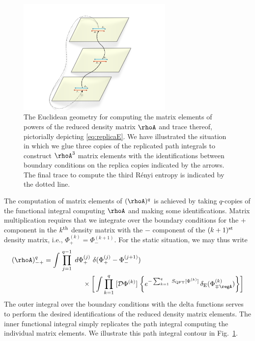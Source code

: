 \documentclass[12pt,openany]{book}
\begin{document}
\begin{figure}[t]
\begin{center}
\includegraphics[width=3in]{figures/rho3E}
\caption{ The Euclidean geometry for computing the matrix elements of powers of the  reduced density matrix $\rhoA$ and trace thereof, pictorially depicting \eqref{eq:replicaE}. We have illustrated the situation in which we glue three copies of the replicated path integrals to construct $\rhoA^3$ matrix elements with the identifications between boundary conditions on the replica copies indicated by the arrows. The final trace to compute the third R\'enyi entropy is indicated by the dotted line.}
\label{f:rho3E}
\end{center}
\end{figure}
%

The computation of matrix elements of $(\rhoA)^q$ is achieved by taking $q$-copies of the functional integral computing $\rhoA$ and making some identifications. Matrix multiplication requires that we integrate over the boundary conditions for the $+$ component in the $k^{\rm th}$ density matrix with the $-$ component of the $(k+1)^{\rm st}$ density matrix, i.e., $\Phi_+^{(k)} = \Phi_-^{(k+1)}$.
For the static situation, we may thus write
%
\begin{align}
(\rhoA)^q_{-+} &= \int\, \prod_{j=1}^{q-1} \; d\Phi_+^{(j)}\   \delta(\Phi^{(j)}_+ - \Phi^{(j+1)}_-)
\nonumber \\
& \hspace{2cm}
  \times \bigg[ \int \prod_{k=1}^q \; [{\cal D} \Phi^{(k)}] \;  \bigg\{ e^{-\sum_{k=1}^q \;
  S_\text{QFT}[\Phi^{(k)}]} \,  \delta_\text{E}(\Phi^{(k)}_{\mp \regA})  \bigg\}
\bigg]
\label{eq:replicaE}
\end{align}
%
The outer integral over the boundary conditions with the delta functions serves to perform the desired identifications of the reduced density matrix elements. The inner functional integral simply replicates the path integral computing the individual matrix elements. We illustrate this path integral contour in Fig.~\ref{f:rho3E}.
\end{document}
